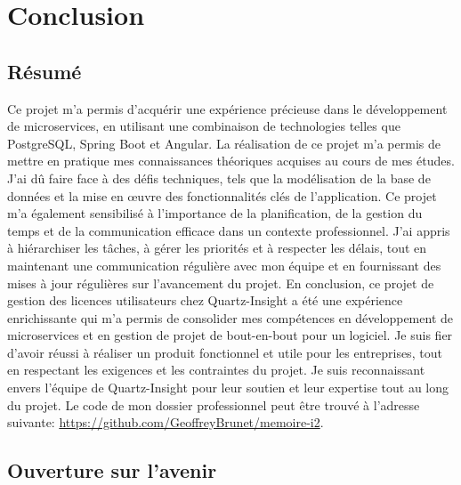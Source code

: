 \documentclass[a4paper, 11pt]{report}
\begin{document}
\chapter{Conclusion}

\section{Résumé}
Ce projet m'a permis d'acquérir une expérience précieuse dans le dévelop\-pement de microservices, en utilisant une combinaison de technologies telles que PostgreSQL, Spring Boot et Angular.
La réalisation de ce projet m'a permis de mettre en pratique mes connaissances théoriques acquises au cours de mes études.
J'ai dû faire face à des défis techniques, tels que la modélisation de la base de données et la mise en œuvre des fonctionnalités clés de l'application.
Ce projet m'a également sensibilisé à l'importance de la planification, de la gestion du temps et de la communication efficace dans un contexte professionnel.
J'ai appris à hiérarchiser les tâches, à gérer les priorités et à respecter les délais, tout en maintenant une communication régulière avec mon équipe et en fournissant des mises à jour régulières sur l'avancement du projet.
\newline
\newline
En conclusion, ce projet de gestion des licences utilisateurs chez Quartz-Insight a été une expérience enrichissante qui m'a permis de consolider mes compétences en développement de microservices et en gestion de projet de bout-en-bout pour un logiciel.
Je suis fier d'avoir réussi à réaliser un produit fonctionnel et utile pour les entreprises, tout en respectant les exigences et les contraintes du projet.
Je suis reconnaissant envers l'équipe de Quartz-Insight pour leur soutien et leur expertise tout au long du projet.
\newline
\newline
Le code de mon dossier professionnel peut être trouvé à l'adresse suivante: \href{https://github.com/GeoffreyBrunet/memoire-i2}{https://github.com/GeoffreyBrunet/memoire-i2}.

\section{Ouverture sur l'avenir}
\end{document}
